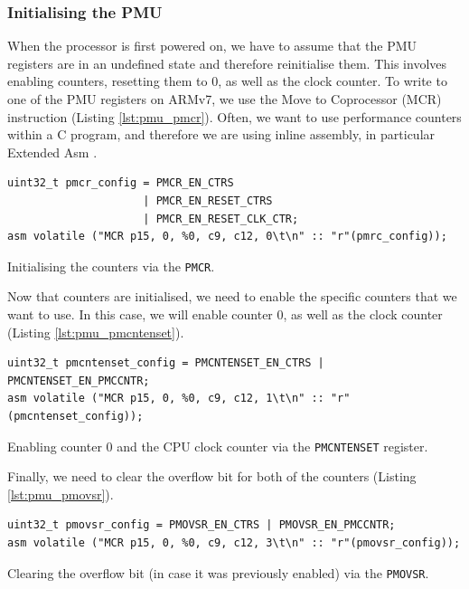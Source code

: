 {\subsubsection{Initialising the PMU}

When the processor is first powered on, we have to assume that the PMU registers are in an undefined state and therefore reinitialise them. This involves enabling counters, resetting them to 0, as well as the clock counter. To write to one of the PMU registers on ARMv7, we use the Move to Coprocessor (MCR) instruction \cite{DocsArmMCR} (Listing \ref{lst:pmu_pmcr}). Often, we want to use performance counters within a C program, and therefore we are using inline assembly, in particular Extended Asm \cite{DocsGCCExtendedAsm}.

\begin{listing}
    \begin{verbatim}
uint32_t pmcr_config = PMCR_EN_CTRS
                     | PMCR_EN_RESET_CTRS
                     | PMCR_EN_RESET_CLK_CTR;
asm volatile ("MCR p15, 0, %0, c9, c12, 0\t\n" :: "r"(pmrc_config));
    \end{verbatim}
    \caption{Initialising the counters via the \texttt{PMCR}.}
    \label{lst:pmu_pmcr}
\end{listing}

Now that counters are initialised, we need to enable the specific counters that we want to use. In this case, we will enable counter 0, as well as the clock counter (Listing \ref{lst:pmu_pmcntenset}).

\begin{listing}
    \begin{verbatim}
uint32_t pmcntenset_config = PMCNTENSET_EN_CTRS | PMCNTENSET_EN_PMCCNTR;
asm volatile ("MCR p15, 0, %0, c9, c12, 1\t\n" :: "r"(pmcntenset_config));
    \end{verbatim}
    \caption{Enabling counter 0 and the CPU clock counter via the \texttt{PMCNTENSET} register.}
    \label{lst:pmu_pmcntenset}
\end{listing}

Finally, we need to clear the overflow bit for both of the counters (Listing \ref{lst:pmu_pmovsr}).

\begin{listing}
    \begin{verbatim}
uint32_t pmovsr_config = PMOVSR_EN_CTRS | PMOVSR_EN_PMCCNTR;
asm volatile ("MCR p15, 0, %0, c9, c12, 3\t\n" :: "r"(pmovsr_config));
    \end{verbatim}
    \caption{Clearing the overflow bit (in case it was previously enabled) via the \texttt{PMOVSR}.}
    \label{lst:pmu_pmovsr}
\end{listing}

}
